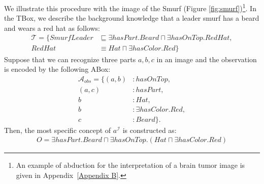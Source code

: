 \documentclass{article}
\begin{document}
We illustrate this procedure with the image of the Smurf (Figure \ref{fig:smurf})\footnote{An example of abduction for the interpretation of a brain tumor image is given in Appendix~\ref{Appendix B}.}.
In the TBox, we describe the background knowledge that a leader smurf has a beard and wears a red hat as follows:
\begin{align*}
\mathcal{T}=\{SmurfLeader &\sqsubseteq \exists hasPart.Beard \sqcap \exists hasOnTop.RedHat, \\
RedHat &\equiv Hat \sqcap \exists hasColor.Red \} 
\end{align*}
Suppose that we can recognize three parts $a,b,c$ in an image and the observation is encoded by the following ABox:
\begin{align*}
\mathcal{A}_{obs} =\{(a,b)&: hasOnTop, \\
 (a,c)&: hasPart,\\
 b&:Hat,\\
 b&:\exists hasColor.Red,\\
 c&:Beard\}.
\end{align*}
Then, the most specific concept of $a^\mathcal{I}$ is constructed as:
\begin{align*}
O=\exists hasPart.Beard \sqcap \exists hasOnTop.(Hat \sqcap  \exists hasColor.Red) 
\end{align*}
\end{document}
